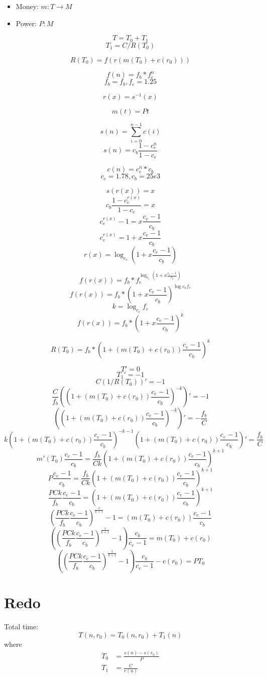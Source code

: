 \documentclass{article}
\begin{document}
\begin{itemize}
    \item Money: $m : T \to M$
    \item Power: $P : M$
\end{itemize}


\[ T = T_0 + T_1 \]
\[ T_1 = C / R(T_0) \]

\[ R(T_0) = f(r(m(T_0) + c(r_0))) \]

\[ f(n) = f_b * f_e^n \]
\[ f_b = f_b, f_e = 1.25 \]

\[ r(x) = s^{-1}(x) \]


\[ m(t) = Pt \]

\[ s(n) = \sum_{i = 0}^{n - 1} c(i) \]
\[ s(n) = c_b \frac{1 - c_e^n}{1 - c_e} \]

\[ c(n) = c_e^n * c_b \] 
\[ c_e = 1.78, c_b = 25e3 \]

\[ s(r(x)) = x \]
\[ c_b \frac{1 - c_e^{r(x)}}{1 - c_e} = x \]
\[ c_e^{r(x)} - 1 = x\frac{c_e - 1}{c_b} \]
\[ c_e^{r(x)} = 1 + x\frac{c_e - 1}{c_b} \]
\[ r(x) = \log_{c_e}(1 + x\frac{c_e - 1}{c_b}) \]

\[ f(r(x)) = f_b * f_e^{\log_{c_e}(1 + x\frac{c_e - 1}{c_b})} \]
\[ f(r(x)) = f_b * (1 + x\frac{c_e - 1}{c_b})^{\log{c_e}{f_e}} \]
\[ k = \log_{c_e}{f_e} \]
\[ f(r(x)) = f_b * (1 + x\frac{c_e - 1}{c_b})^k \]

\[ R(T_0) = f_b * (1 + (m(T_0) + c(r_0))\frac{c_e - 1}{c_b})^k \]


\[ T' = 0 \]
\[ T_1' = -1 \]
\[ C (1 / R(T_0))' = -1 \]
\[ \frac{C}{f_b} ((1 + (m(T_0) + c(r_0))\frac{c_e - 1}{c_b})^{-k})' = -1 \]
\[ ((1 + (m(T_0) + c(r_0))\frac{c_e - 1}{c_b})^{-k})' = -\frac{f_b}{C} \]
\[ k(1 + (m(T_0) + c(r_0))\frac{c_e - 1}{c_b})^{-k-1}(1 + (m(T_0) + c(r_0))\frac{c_e - 1}{c_b})' = \frac{f_b}{C} \]
\[ m'(T_0)\frac{c_e - 1}{c_b} = \frac{f_b}{Ck} (1 + (m(T_0) + c(r_0))\frac{c_e - 1}{c_b})^{k+1} \]
\[ P\frac{c_e - 1}{c_b} = \frac{f_b}{Ck} (1 + (m(T_0) + c(r_0))\frac{c_e - 1}{c_b})^{k+1} \]
\[ \frac{PCk}{f_b}\frac{c_e - 1}{c_b} = (1 + (m(T_0) + c(r_0))\frac{c_e - 1}{c_b})^{k+1} \]
\[ \left(\frac{PCk}{f_b}\frac{c_e - 1}{c_b}\right)^{\frac{1}{k + 1}} - 1 = (m(T_0) + c(r_0))\frac{c_e - 1}{c_b} \]
\[ \left(\left(\frac{PCk}{f_b}\frac{c_e - 1}{c_b}\right)^{\frac{1}{k + 1}} - 1\right)\frac{c_b}{c_e - 1} = m(T_0) + c(r_0) \]
\[ \left(\left(\frac{PCk}{f_b}\frac{c_e - 1}{c_b}\right)^{\frac{1}{k + 1}} - 1\right)\frac{c_b}{c_e - 1} - c(r_0) = PT_0 \]

\newpage
\section{Redo}
Total time:
\[ T(n, r_0) = T_0(n, r_0) + T_1(n) \]
where
\begin{align*}
    T_0 &= \frac{s(n) - s(r_0)}{P} \\
    T_1 &= \frac{C}{r(n)} 
\end{align*}
\end{document}
